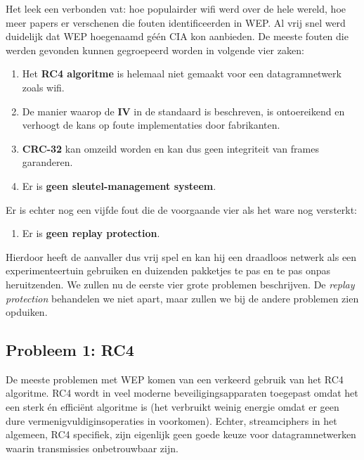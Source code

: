 \documentclass[
  10pt,
  dutch,
  paper=a4,
  ,captions=tableheading
]{scrbook}
\providecommand{\tightlist}{%
  \setlength{\itemsep}{0pt}\setlength{\parskip}{0pt}}
\begin{document}
Het leek een verbonden vat: hoe populairder wifi werd over de hele
wereld, hoe meer papers er verschenen die fouten identificeerden in WEP.
Al vrij snel werd duidelijk dat WEP hoegenaamd géén CIA kon aanbieden.
De meeste fouten die werden gevonden kunnen gegroepeerd worden in
volgende vier zaken:

\begin{enumerate}
\def\labelenumi{\arabic{enumi}.}
\tightlist
\item
  Het \textbf{RC4 algoritme} is helemaal niet gemaakt voor een
  datagramnetwerk zoals wifi.
\item
  De manier waarop de \textbf{IV} in de standaard is beschreven, is
  ontoereikend en verhoogt de kans op foute implementaties door
  fabrikanten.
\item
  \textbf{CRC-32} kan omzeild worden en kan dus geen integriteit van
  frames garanderen.
\item
  Er is \textbf{geen sleutel-management systeem}.
\end{enumerate}

Er is echter nog een vijfde fout die de voorgaande vier als het ware nog
versterkt:

\begin{enumerate}
\def\labelenumi{\arabic{enumi}.}
\setcounter{enumi}{4}
\tightlist
\item
  Er is \textbf{geen replay protection}.
\end{enumerate}

Hierdoor heeft de aanvaller dus vrij spel en kan hij een draadloos
netwerk als een experimenteertuin gebruiken en duizenden pakketjes te
pas en te pas onpas heruitzenden. We zullen nu de eerste vier grote
problemen beschrijven. De \emph{replay protection} behandelen we niet
apart, maar zullen we bij de andere problemen zien opduiken.

\subsection{Probleem 1: RC4}\label{probleem-1-rc4}

De meeste problemen met WEP komen van een verkeerd gebruik van het RC4
algoritme. RC4 wordt in veel moderne beveiligingsapparaten toegepast
omdat het een sterk én efficiënt algoritme is (het verbruikt weinig
energie omdat er geen dure vermenigvuldiginsoperaties in voorkomen).
Echter, streamciphers in het algemeen, RC4 specifiek, zijn eigenlijk
geen goede keuze voor datagramnetwerken waarin transmissies
onbetrouwbaar zijn.
\end{document}
